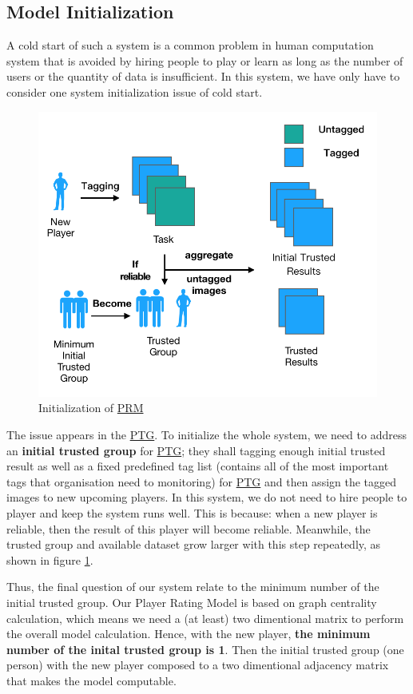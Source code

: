 \subsection{Model Initialization}
\label{chapter:modelinit}

A cold start of such a system is a common problem in human computation system that 
is avoided by hiring people to play or learn as long as 
the number of users or the quantity of data is insufficient.
In this system, we have only have to consider one system initialization issue of cold start.

\begin{figure}[htp]
\centering
\includegraphics[width=0.5\columnwidth]{figures/coldstart2}
\caption{Initialization of \hyperref[idx:prm]{PRM}}
\label{fig:cold}
\end{figure}

The issue appears in the \hyperref[idx:ptg]{PTG}. 
To initialize the whole system, we need to address an \textbf{initial trusted group} for \hyperref[idx:ptg]{PTG}; 
they shall tagging enough initial trusted result as well as a fixed predefined tag list 
(contains all of the most important tags that organisation need to monitoring)
for \hyperref[idx:ptg]{PTG} and then assign the tagged images to new upcoming players. 
In this system, we do not need to hire people to player and keep the system runs well. This is because: 
when a new player is reliable, then the result of this player will become reliable. 
Meanwhile, the trusted group and available dataset grow larger with this step repeatedly, 
as shown in figure \ref{fig:cold}.

Thus, the final question of our system relate to the minimum number of the initial trusted group.
Our Player Rating Model is based on graph centrality calculation, which means we need a (at least) two dimentional matrix
to perform the overall model calculation. Hence, with the new player, \textbf{the minimum number of the inital trusted group is 1}.
Then the initial trusted group (one person) with the new player composed to a two dimentional adjacency matrix that makes the model
computable.